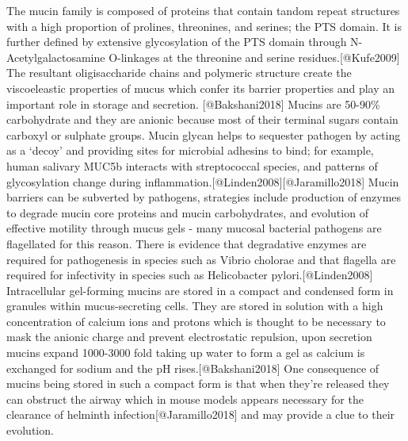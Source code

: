 \documentclass[
]{article}
\begin{document}
The mucin family is composed of proteins that contain tandom repeat
structures with a high proportion of prolines, threonines, and serines;
the PTS domain. It is further defined by extensive glycosylation of the
PTS domain through N-Acetylgalactosamine O-linkages at the threonine and
serine residues.{[}@Kufe2009{]} The resultant oligisaccharide chains and
polymeric structure create the viscoeleastic properties of mucus which
confer its barrier properties and play an important role in storage and
secretion. {[}@Bakshani2018{]} Mucins are 50-90\% carbohydrate and they
are anionic because most of their terminal sugars contain carboxyl or
sulphate groups. Mucin glycan helps to sequester pathogen by acting as a
`decoy' and providing sites for microbial adhesins to bind; for example,
human salivary MUC5b interacts with streptococcal species, and patterns
of glycosylation change during
inflammation.{[}@Linden2008{]}{[}@Jaramillo2018{]} Mucin barriers can be
subverted by pathogens, strategies include production of enzymes to
degrade mucin core proteins and mucin carbohydrates, and evolution of
effective motility through mucus gels - many mucosal bacterial pathogens
are flagellated for this reason. There is evidence that degradative
enzymes are required for pathogenesis in species such as Vibrio cholorae
and that flagella are required for infectivity in species such as
Helicobacter pylori.{[}@Linden2008{]} Intracellular gel-forming mucins
are stored in a compact and condensed form in granules within
mucus-secreting cells. They are stored in solution with a high
concentration of calcium ions and protons which is thought to be
necessary to mask the anionic charge and prevent electrostatic
repulsion, upon secretion mucins expand 1000-3000 fold taking up water
to form a gel as calcium is exchanged for sodium and the pH
rises.{[}@Bakshani2018{]} One consequence of mucins being stored in such
a compact form is that when they're released they can obstruct the
airway which in mouse models appears necessary for the clearance of
helminth infection{[}@Jaramillo2018{]} and may provide a clue to their
evolution.
\end{document}
